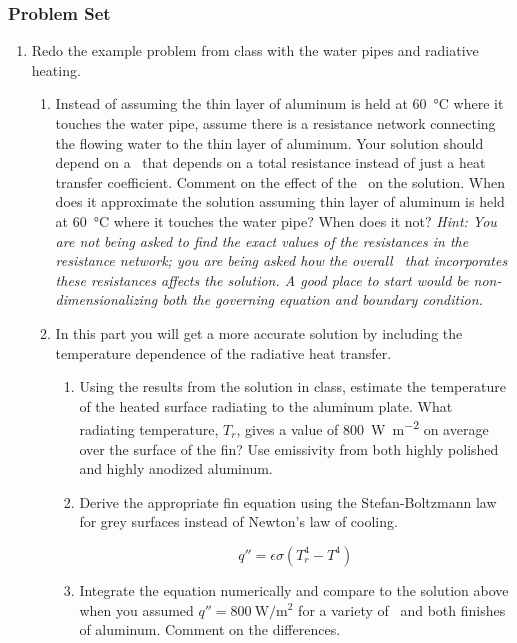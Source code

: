 \documentclass[12pt,letterpaper]{article}
\begin{document}
\subsubsection*{Problem Set}
\begin{enumerate}

\item Redo the example problem from class with the water pipes and radiative heating.
	
	\begin{enumerate}
		\item Instead of assuming the thin layer of aluminum is held at \SI{60}{\celsius} where it touches the water pipe, assume there is a resistance network connecting the flowing water to the thin layer of aluminum.
			Your solution should depend on a \Bi~that depends on a total resistance instead of just a heat transfer coefficient.
			Comment on the effect of the \Bi~on the solution.
			When does it approximate the solution assuming thin layer of aluminum is held at \SI{60}{\celsius} where it touches the water pipe?
			When does it not?
			\textit{Hint: You are not being asked to find the exact values of the resistances in the resistance network; you are being asked how the overall \Bi~that incorporates these resistances affects the solution.
			A good place to start would be non-dimensionalizing both the governing equation and boundary condition.}
		\item In this part you will get a more accurate solution by including the temperature dependence of the radiative heat transfer.
			\begin{enumerate}
				\item Using the results from the solution in class, estimate the temperature of the heated surface radiating to the aluminum plate.
					What radiating temperature, $T_r$, gives a value of \SI{800}{\watt\per\square\meter} on average over the surface of the fin?
					Use emissivity from both highly polished and highly anodized aluminum.
				\item Derive the appropriate fin equation using the Stefan-Boltzmann law for grey surfaces instead of Newton's law of cooling.
				
				\begin{equation*}
					q'' = \epsilon \sigma \left( T_r^4 - T^4 \right)
				\end{equation*}
				
				\item Integrate the equation numerically and compare to the solution above when you assumed $q'' = \SI{800}{\watt\per\square\meter}$ for a variety of \Bi~and both finishes of aluminum.
					Comment on the differences.
			\end{enumerate}
	\end{enumerate}


\end{enumerate}
\end{document}

